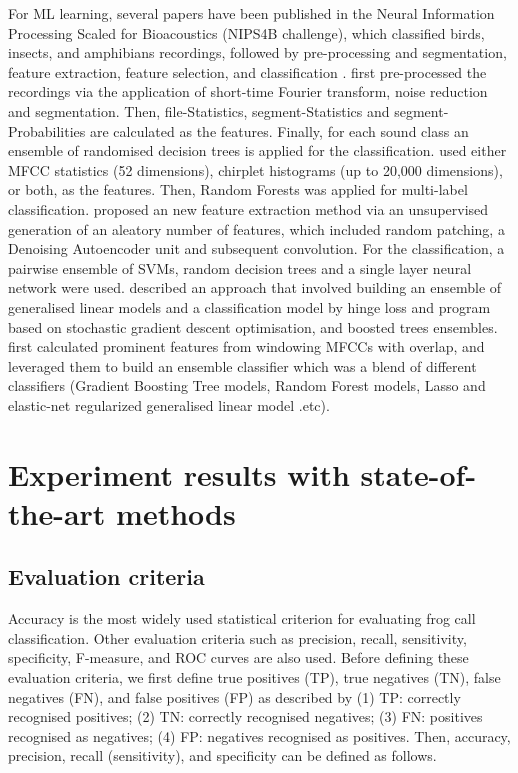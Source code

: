 For ML learning, several papers have been published in the Neural Information Processing Scaled for Bioacoustics (NIPS4B challenge), which classified birds, insects, and amphibians recordings, followed by pre-processing and segmentation, feature extraction, feature selection, and classification \citep{lasseck2013bird, stowell2013feature, mencia2013learning, massaronensemble, chen2013novel}. \citep{lasseck2013bird} first pre-processed the recordings via the application of short-time Fourier transform, noise reduction and segmentation. Then, file-Statistics, segment-Statistics and segment-Probabilities are calculated as the features. Finally, for each sound class an ensemble of
randomised decision trees is applied for the classification. \citep{stowell2013feature} used either MFCC statistics (52 dimensions), chirplet histograms (up
to 20,000 dimensions), or both, as the features. Then, Random Forests was applied for multi-label classification. \citep{mencia2013learning} proposed an new feature extraction method via an unsupervised generation of an aleatory number of features, which included random patching, a Denoising Autoencoder unit and subsequent convolution. For the classification, a pairwise ensemble of SVMs, random decision trees and a single layer
neural network were used. 
\citep{massaronensemble} described an approach that involved building an ensemble of generalised linear models and a classification model by hinge loss and program based on stochastic gradient descent optimisation, and boosted trees ensembles. 
\citep{chen2013novel} first calculated prominent features from windowing MFCCs with overlap, and leveraged them to build an ensemble classifier which was a blend of different classifiers (Gradient Boosting Tree models, Random Forest models, Lasso and elastic-net regularized generalised linear model .etc).




\section{Experiment results with state-of-the-art methods}
\label{ch2:experiment}


\subsection{Evaluation criteria}

Accuracy is the most widely used statistical criterion for evaluating frog call classification. Other evaluation criteria such as precision, recall, sensitivity, specificity, F-measure, and ROC curves are also used. Before defining these evaluation criteria, we first define true positives (TP), true negatives (TN), false negatives (FN), and false positives (FP) as described by  \citep{gordon2003sequence} 
(1) TP: correctly recognised positives;
(2) TN: correctly recognised negatives;
(3) FN: positives recognised as negatives;
(4) FP: negatives recognised as positives.
Then, accuracy, precision, recall (sensitivity), and specificity can be defined as follows.

